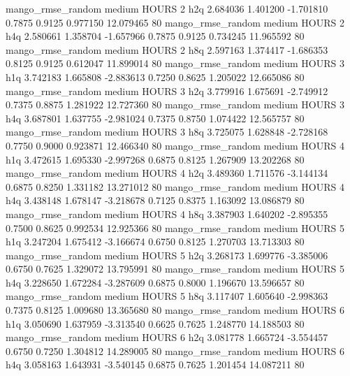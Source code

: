 mango_rmse_random     medium    HOURS                 2                  h2q  2.684036 1.401200 -1.701810 0.7875 0.9125  0.977150   12.079465 80
mango_rmse_random     medium    HOURS                 2                  h4q  2.580661 1.358704 -1.657966 0.7875 0.9125  0.734245   11.965592 80
mango_rmse_random     medium    HOURS                 2                  h8q  2.597163 1.374417 -1.686353 0.8125 0.9125  0.612047   11.899014 80
mango_rmse_random     medium    HOURS                 3                  h1q  3.742183 1.665808 -2.883613 0.7250 0.8625  1.205022   12.665086 80
mango_rmse_random     medium    HOURS                 3                  h2q  3.779916 1.675691 -2.749912 0.7375 0.8875  1.281922   12.727360 80
mango_rmse_random     medium    HOURS                 3                  h4q  3.687801 1.637755 -2.981024 0.7375 0.8750  1.074422   12.565757 80
mango_rmse_random     medium    HOURS                 3                  h8q  3.725075 1.628848 -2.728168 0.7750 0.9000  0.923871   12.466340 80
mango_rmse_random     medium    HOURS                 4                  h1q  3.472615 1.695330 -2.997268 0.6875 0.8125  1.267909   13.202268 80
mango_rmse_random     medium    HOURS                 4                  h2q  3.489360 1.711576 -3.144134 0.6875 0.8250  1.331182   13.271012 80
mango_rmse_random     medium    HOURS                 4                  h4q  3.438148 1.678147 -3.218678 0.7125 0.8375  1.163092   13.086879 80
mango_rmse_random     medium    HOURS                 4                  h8q  3.387903 1.640202 -2.895355 0.7500 0.8625  0.992534   12.925366 80
mango_rmse_random     medium    HOURS                 5                  h1q  3.247204 1.675412 -3.166674 0.6750 0.8125  1.270703   13.713303 80
mango_rmse_random     medium    HOURS                 5                  h2q  3.268173 1.699776 -3.385006 0.6750 0.7625  1.329072   13.795991 80
mango_rmse_random     medium    HOURS                 5                  h4q  3.228650 1.672284 -3.287609 0.6875 0.8000  1.196670   13.596657 80
mango_rmse_random     medium    HOURS                 5                  h8q  3.117407 1.605640 -2.998363 0.7375 0.8125  1.009680   13.365680 80
mango_rmse_random     medium    HOURS                 6                  h1q  3.050690 1.637959 -3.313540 0.6625 0.7625  1.248770   14.188503 80
mango_rmse_random     medium    HOURS                 6                  h2q  3.081778 1.665724 -3.554457 0.6750 0.7250  1.304812   14.289005 80
mango_rmse_random     medium    HOURS                 6                  h4q  3.058163 1.643931 -3.540145 0.6875 0.7625  1.201454   14.087211 80
